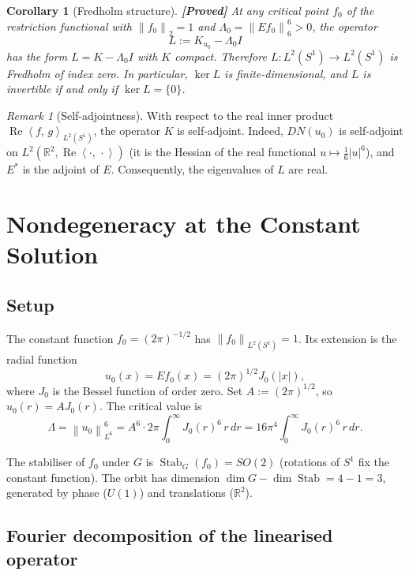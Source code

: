 \documentclass[12pt]{article}
\newtheorem{corollary}[theorem]{Corollary}
\theoremstyle{definition}
\theoremstyle{remark}
\newtheorem{remark}[theorem]{Remark}
\DeclareMathOperator{\Stab}{Stab}
\newcommand{\R}{\mathbb{R}}
\newcommand{\norm}[1]{\left\|#1\right\|}
\newcommand{\ip}[2]{\left\langle #1,\, #2\right\rangle}
\newcommand{\re}{\operatorname{Re}}
\newcommand{\proven}{\textbf{\color{teal}[Proved]}}
\begin{document}
\begin{corollary}[Fredholm structure]  \label{cor:fredholm}
  \proven\quad
  At any critical point $f_0$ of the restriction functional with
  $\norm{f_0}_2=1$ and $\Lambda_0=\norm{Ef_0}_6^6>0$, the operator
  \[
    L := K_{u_0} - \Lambda_0 I
  \]
  has the form $L=K-\Lambda_0 I$ with $K$ compact.  Therefore
  $L:L^2(S^1)\to L^2(S^1)$ is Fredholm of index zero.
  In particular, $\ker L$ is finite-dimensional, and $L$ is invertible
  if and only if $\ker L=\{0\}$.
\end{corollary}

\begin{remark}[Self-adjointness]
  With respect to the real inner product
  $\re\ip{f}{g}_{L^2(S^1)}$, the operator $K$ is self-adjoint.
  Indeed, $DN(u_0)$ is self-adjoint on $L^2(\R^2,\re\ip{\cdot}{\cdot})$
  (it is the Hessian of the real functional $u\mapsto\tfrac{1}{6}|u|^6$),
  and $E^*$ is the adjoint of $E$.  Consequently, the eigenvalues of $L$
  are real.
\end{remark}

\section{Nondegeneracy at the Constant Solution}
\label{sec:nondeg}

\subsection{Setup}

The constant function $f_0=(2\pi)^{-1/2}$ has $\norm{f_0}_{L^2(S^1)}=1$.
Its extension is the radial function
\[
  u_0(x) = Ef_0(x) = (2\pi)^{1/2}J_0(|x|),
\]
where $J_0$ is the Bessel function of order zero.  Set $A:=(2\pi)^{1/2}$, so
$u_0(r)=AJ_0(r)$.  The critical value is
\[
  \Lambda = \norm{u_0}_{L^6}^6
  = A^6\cdot 2\pi\int_0^\infty J_0(r)^6\,r\,dr
  = 16\pi^4\int_0^\infty J_0(r)^6\,r\,dr.
\]

The stabiliser of $f_0$ under $G$ is $\Stab_G(f_0)=SO(2)$ (rotations of
$S^1$ fix the constant function).  The orbit has dimension
$\dim G-\dim\Stab=4-1=3$, generated by phase ($U(1)$) and translations
($\R^2$).

\subsection{Fourier decomposition of the linearised operator}
\end{document}
